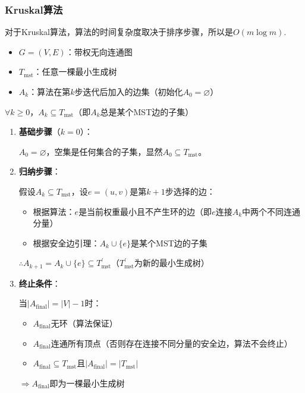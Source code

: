 \documentclass[./../main.tex]{subfiles}
\begin{document}
\subsubsection{Kruskal算法}
对于Kruskal算法，算法的时间复杂度取决于排序步骤，所以是$O(m\log m)$.

\begin{itemize}
    \item $G=(V,E)$：带权无向连通图
    \item $T_{\text{mst}}$：任意一棵最小生成树
    \item $A_{k}$：算法在第$k$步迭代后加入的边集（初始化$A_{0}=\varnothing$）
\end{itemize}

$\forall k\geq 0$，$A_{k}\subseteq T_{\text{mst}}$（即$A_{k}$总是某个MST边的子集）

\begin{enumerate}
    \item \textbf{基础步骤}（$k=0$）：
    
    $A_{0}=\varnothing$，空集是任何集合的子集，显然$A_{0}\subseteq T_{\text{mst}}$。
    
    \item \textbf{归纳步骤}：
    
    假设$A_{k}\subseteq T_{\text{mst}}$，设$e=(u,v)$是第$k+1$步选择的边：
    \begin{itemize}
        \item 根据算法：$e$是当前权重最小且不产生环的边（即$e$连接$A_{k}$中两个不同连通分量）
        \item 根据安全边引理：$A_{k}\cup\{e\}$是某个MST边的子集
    \end{itemize}
    $\therefore A_{k+1}=A_{k}\cup\{e\}\subseteq T_{\text{mst}}^{'}$（$T_{\text{mst}}^{'}$为新的最小生成树）
    
    \item \textbf{终止条件}：
    
    当$|A_{\text{final}}|=|V|-1$时：
    \begin{itemize}
        \item $A_{\text{final}}$无环（算法保证）
        \item $A_{\text{final}}$连通所有顶点（否则存在连接不同分量的安全边，算法不会终止）
        \item $A_{\text{final}}\subseteq T_{\text{mst}}$且$|A_{\text{final}}|=|T_{\text{mst}}|$
    \end{itemize}
    $\Rightarrow A_{\text{final}}$即为一棵最小生成树
\end{enumerate}
\end{document}
